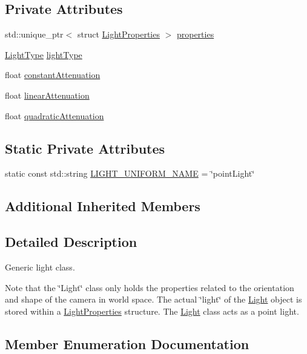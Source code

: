 \subsection*{Private Attributes}
\begin{DoxyCompactItemize}
\item
std\+::unique\+\_\+ptr$<$ struct \hyperlink{struct_light_properties}{Light\+Properties} $>$ \hyperlink{class_light_a74eba4cac1cc27e741230fbda32fceef}{properties}
\item
\hyperlink{class_light_a661d9480e01af8b1612860b9630ef5f8}{Light\+Type} \hyperlink{class_light_ab0c279c927973443f7b52fc924b489aa}{light\+Type}
\item
float \hyperlink{class_light_afef6c00a21aa16dc6cc7a7fb1639d2fa}{constant\+Attenuation}
\item
float \hyperlink{class_light_afcb2da592197efae015ae16c1c5bfceb}{linear\+Attenuation}
\item
float \hyperlink{class_light_a0f24dde11cbbd12d0f0309e189f3640c}{quadratic\+Attenuation}
\end{DoxyCompactItemize}
\subsection*{Static Private Attributes}
\begin{DoxyCompactItemize}
\item
static const std\+::string \hyperlink{class_light_ab2d40f6c364cf728d03a90ff885e37cb}{L\+I\+G\+H\+T\+\_\+\+U\+N\+I\+F\+O\+R\+M\+\_\+\+N\+A\+ME} = \char`\"{}point\+Light\char`\"{}
\end{DoxyCompactItemize}
\subsection*{Additional Inherited Members}


\subsection{Detailed Description}
Generic light class.

Note that the \char`\"{}\+Light\char`\"{} class only holds the properties related to the orientation and shape of the camera in world space. The actual \char`\"{}light\char`\"{} of the \hyperlink{class_light}{Light} object is stored within a \hyperlink{struct_light_properties}{Light\+Properties} structure. The \hyperlink{class_light}{Light} class acts as a point light.

\subsection{Member Enumeration Documentation}
\hypertarget{class_light_a661d9480e01af8b1612860b9630ef5f8}{}\label{class_light_a661d9480e01af8b1612860b9630ef5f8}
